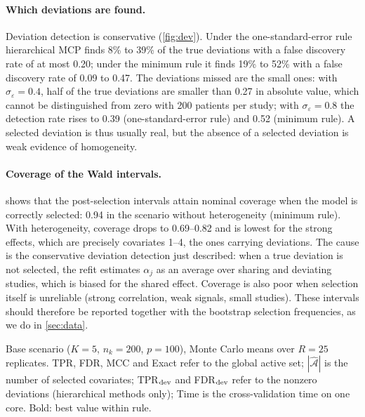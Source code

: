 \documentclass[11pt]{article}
\theoremstyle{remark}
\numberwithin{equation}{section}
\begin{document}
\paragraph{Which deviations are found.} Deviation detection is conservative
(\cref{fig:dev}). Under the one-standard-error rule hierarchical MCP finds 8\% to
39\% of the true deviations with a false discovery rate of at most 0.20; under the
minimum rule it finds 19\% to 52\% with a false discovery rate of 0.09 to 0.47. The
deviations missed are the small ones: with $\sigma_\varepsilon=0.4$, half of the
true deviations are smaller than 0.27 in absolute value, which cannot be
distinguished from zero with 200 patients per study; with $\sigma_\varepsilon=0.8$
the detection rate rises to 0.39 (one-standard-error rule) and 0.52 (minimum rule). A selected deviation is thus usually real, but
the absence of a selected deviation is weak evidence of homogeneity.

\paragraph{Coverage of the Wald intervals.}  shows that the
post-selection intervals attain nominal coverage when the model is correctly
selected: 0.94 in the scenario without heterogeneity (minimum rule). With
heterogeneity, coverage drops to 0.69--0.82 and is lowest for the strong effects,
which are precisely covariates 1--4, the ones carrying deviations. The cause is the
conservative deviation detection just described: when a true deviation is not
selected, the refit estimates $\alpha_j$ as an average over sharing and deviating
studies, which is biased for the shared effect. Coverage is also poor when selection
itself is unreliable (strong correlation, weak signals, small studies). These
intervals should therefore be reported together with the bootstrap selection
frequencies, as we do in \cref{sec:data}.

\begin{table}[!htbp]
\centering\small
\caption{Base scenario ($K=5$, $n_k=200$, $p=100$), Monte Carlo means over $R=25$
replicates. TPR, FDR, MCC and Exact refer to the global active set; $|\hat{\mathcal A}|$ is
the number of selected covariates; TPR$_{\rm dev}$ and FDR$_{\rm dev}$ refer to the nonzero
deviations (hierarchical methods only); Time is the cross-validation time on one core.
Bold: best value within rule.}
\label{tab:sim_base}
\setlength{\tabcolsep}{4pt}
\begin{adjustbox}{max width=\linewidth}\end{adjustbox}
\end{table}
\end{document}
